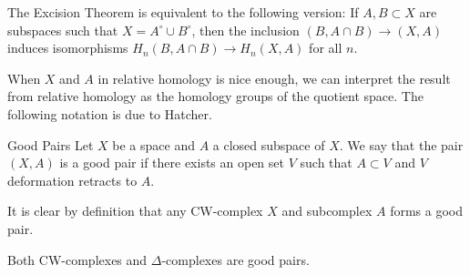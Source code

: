 \documentclass[a4paper]{article}
\begin{document}
\begin{lmm}{}{} The Excision Theorem is equivalent to the following version: If $A,B\subset X$ are subspaces such that $X=A^\circ\cup B^\circ$, then the inclusion $(B,A\cap B)\to (X,A)$ induces isomorphisms $H_n(B,A\cap B)\to H_n(X,A)$ for all $n$. 
\end{lmm}

When $X$ and $A$ in relative homology is nice enough, we can interpret the result from relative homology as the homology groups of the quotient space. The following notation is due to Hatcher. 

\begin{defn}{Good Pairs}{} Let $X$ be a space and $A$ a closed subspace of $X$. We say that the pair $(X,A)$ is a good pair if there exists an open set $V$ such that $A\subset V$ and $V$ deformation retracts to $A$. 
\end{defn}

It is clear by definition that any CW-complex $X$ and subcomplex $A$ forms a good pair. 

\begin{lmm}{}{} Both CW-complexes and $\Delta$-complexes are good pairs. 
\end{lmm}
\end{document}

